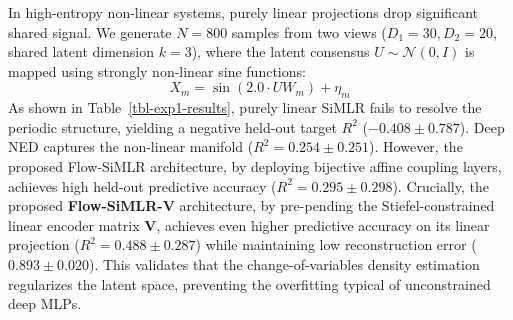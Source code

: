 \documentclass[
  letterpaper,
]{report}
\begin{document}
In high-entropy non-linear systems, purely linear projections drop
significant shared signal. We generate \(N=800\) samples from two views
(\(D_1=30, D_2=20\), shared latent dimension \(k=3\)), where the latent
consensus \(U \sim \mathcal{N}(0, I)\) is mapped using strongly
non-linear sine functions: \[X_m = \sin(2.0 \cdot U W_m) + \eta_m\] As
shown in Table~\ref{tbl-exp1-results}, purely linear SiMLR fails to
resolve the periodic structure, yielding a negative held-out target
\(R^2\) (\(-0.408 \pm 0.787\)). Deep NED captures the non-linear
manifold (\(R^2 = 0.254 \pm 0.251\)). However, the proposed Flow-SiMLR
architecture, by deploying bijective affine coupling layers, achieves
high held-out predictive accuracy (\(R^2 = 0.295 \pm 0.298\)).
Crucially, the proposed \textbf{Flow-SiMLR-V} architecture, by
pre-pending the Stiefel-constrained linear encoder matrix
\(\mathbf{V}\), achieves even higher predictive accuracy on its linear
projection (\(R^2 = 0.488 \pm 0.287\)) while maintaining low
reconstruction error (\(0.893 \pm 0.020\)). This validates that the
change-of-variables density estimation regularizes the latent space,
preventing the overfitting typical of unconstrained deep MLPs.
\end{document}
